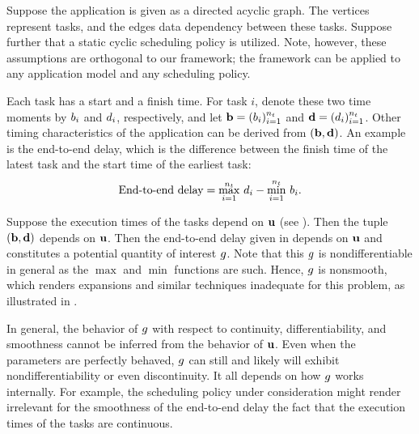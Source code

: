 Suppose the application is given as a directed acyclic graph. The vertices
represent tasks, and the edges data dependency between these tasks. Suppose
further that a static cyclic scheduling policy is utilized. Note, however, these
assumptions are orthogonal to our framework; the framework can be applied to any
application model and any scheduling policy.

Each task has a start and a finish time. For task $i$, denote these two time
moments by $b_i$ and $d_i$, respectively, and let $\mathbf{b} = (b_i)_{i=1}^{n_t}$ and
$\mathbf{d} = (d_i)_{i=1}^{n_t}$. Other timing characteristics of the application can be
derived from $(\mathbf{b}, \mathbf{d})$. An example is the end-to-end delay, which is the
difference between the finish time of the latest task and the start time of the
earliest task:
\begin{equation} \elab{end-to-end-delay}
  \text{End-to-end delay} = \max_{i = 1}^\nt \, \d_i - \min_{i = 1}^\nt \, \b_i.
\end{equation}

Suppose the execution times of the tasks depend on $\mathbf{u}$ (see ).
Then the tuple $(\mathbf{b}, \mathbf{d})$ depends on $\mathbf{u}$. Then the end-to-end delay given in
 depends on $\mathbf{u}$ and constitutes a potential quantity of
interest $g$. Note that this $g$ is nondifferentiable in general as the $\max$
and $\min$ functions are such. Hence, $g$ is nonsmooth, which renders 
expansions and similar techniques inadequate for this problem, as illustrated in
.

\begin{remark} 
In general, the behavior of $g$ with respect to continuity, differentiability,
and smoothness cannot be inferred from the behavior of $\mathbf{u}$. Even when the
parameters are perfectly behaved, $g$ can still and likely will exhibit
nondifferentiability or even discontinuity. It all depends on how $g$ works
internally. For example, the scheduling policy under consideration might render
irrelevant for the smoothness of the end-to-end delay the fact that the
execution times of the tasks are continuous.
\end{remark}
